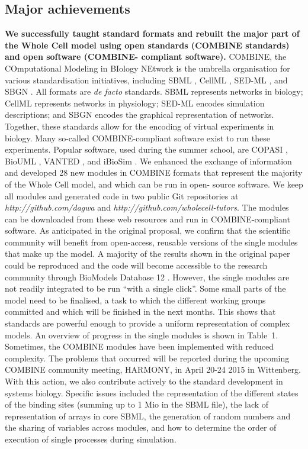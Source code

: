 \documentclass[journal,transmag]{IEEEtran}
\begin{document}
\subsection{Major achievements}
\textbf{We successfully taught standard formats and rebuilt the major part of the Whole Cell model using open standards (COMBINE standards) and open software (COMBINE-
compliant software).} 
COMBINE, the COmputational Modeling in BIology NEtwork \cite{} is the umbrella organisation for various standardisation initiatives, including SBML \cite{}, CellML \cite{}, SED-ML \cite{}, and SBGN \cite{}. 
All formats are \emph{de facto} standards. 
SBML represents networks in biology; CellML represents networks in physiology; SED-ML encodes simulation descriptions; and SBGN encodes the graphical representation of networks. 
Together, these standards allow for the encoding of virtual experiments \cite{} in biology. 
Many so-called COMBINE-compliant software exist to run these experiments. 
Popular software, used during the summer school, are COPASI \cite{}, BioUML \cite{}, VANTED \cite{}, and iBioSim \cite{}. 
We enhanced the exchange of information and developed 28 new modules in COMBINE formats that represent the majority of the Whole Cell model, and which can be run in open-
source software. 
We keep all modules and generated code in two public Git repositories at \emph{http://github.com/dagwa} and \emph{http://github.com/wholecell-tutors}. 
The modules can be downloaded from these web resources and run in COMBINE-compliant software. 
As anticipated in the original proposal, we confirm that the scientific community will benefit from open-access, reusable versions of the single modules that make up the model. 
A majority of the results shown in the original paper could be reproduced and the code will become accessible to the research community through BioModels Database 12 . However, the single modules are not readily integrated to be run “with a single click”. 
Some small parts of the model need to be finalised, a task to which the different working groups committed and which will be finished in the next months. 
This shows that standards are powerful enough to provide a uniform representation of complex models. 
An overview of progress in the single modules is shown in Table~1. 
Sometimes, the COMBINE modules have been implemented with reduced complexity. 
The problems that occurred will be reported during the upcoming COMBINE community meeting, HARMONY, in April 20-24 2015 in Wittenberg. 
With this action, we also contribute actively to the standard development in systems biology. 
Specific issues included the representation of the different states of the binding sites (summing up to 1 Mio in the SBML file), the lack of
representation of arrays in core SBML, the generation of random numbers and the sharing of variables across modules, and how to determine the order of execution of single processes during simulation.
\end{document}
